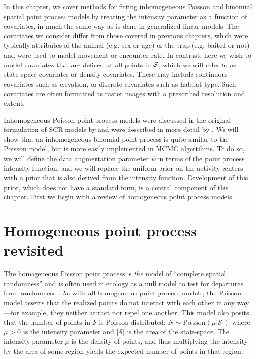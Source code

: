 In this chapter, we cover methods %
for fitting inhomogeneous Poisson and binomial
spatial point process models by treating the intensity parameter as a
function of covariates, in much the same way as is done in generalized linear
models. The covariates we consider differ
from those covered in previous chapters, which were typically
attributes of the animal (e.g. sex or age) or the trap (e.g. baited or
not) and were used to model movement or encounter
rate. In contrast, here we wish to model covariates that are defined
at all points in $\cal S$, which we will refer to as
state-space covariates or density covariates. These may
include continuous covariates such as elevation, or discrete
covariates such as habitat type. Such covariates are often formatted
as raster images with a prescribed resolution and extent.

Inhomogeneous Poisson point process models were discussed in the original
formulation of SCR models by \citet{efford:2004} and were described in
more detail by \citet{borchers_efford:2008}. We will show that an
inhomogeneous binomial point process is quite similar to the Poisson
model, but is more easily implemented in MCMC algortihms. To do so, we
will define the data augmentation parameter $\psi$ in terms of the point
process intensity function, and we will replace the uniform prior on the
activity centers with a prior that is also derived from the intensity
function. Development of this prior, which does not have a
standard form, is a central component of this chapter. First we
begin with a review of homogeneous point process models.


\section{Homogeneous point process revisited}

The homogeneous Poisson point process is \textit{the} model of ``complete
spatial randomness'' and is often used in ecology as a null model
to test for departures from randomness
\citep{cressie:1992, diggle:2003, illian_etal:2008}.
As with all homogeneous point process models, the Poisson model
asserts that the realized points do not interact with each other in
any way---for example, they neither attract nor repel one another.
This model also posits that the number of points in $\mathcal{S}$ is
Poisson distributed: $N \sim \text{Poisson}(\mu|\mathcal{S}|)$ where $\mu>0$ is
the intensity parameter and $|\mathcal{S}|$ is the area of the
state-space. The intensity parameter $\mu$
is the density of points, and thus multiplying the intensity by the area
of some region yields the expected number of points in that region.

